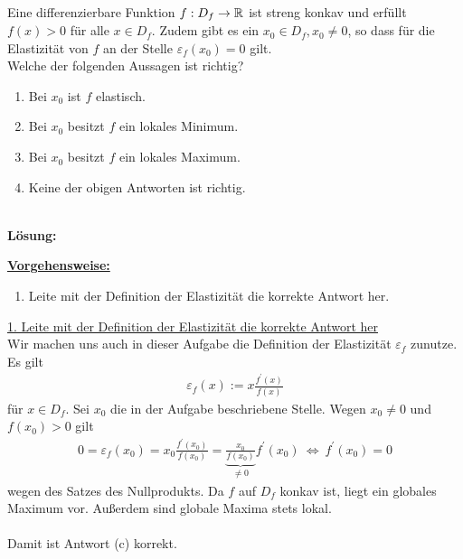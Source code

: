 \subsection*{}
Eine differenzierbare Funktion $ f : D_f \to \mathbb{R}  $ ist streng konkav und erfüllt $ f(x)  > 0 $ für alle $ x \in D_f $.
Zudem gibt es ein $ x_0 \in D_f, x_0 \neq 0 $, so dass für die Elastizität von $ f $ an der Stelle $ \varepsilon_f(x_0 ) = 0 $ gilt.\\
Welche der folgenden Aussagen ist richtig?
\renewcommand{\labelenumi}{(\alph{enumi})}
\begin{enumerate}
	\item 
	Bei $ x_0 $ ist $ f $ elastisch.
	\item
	Bei $ x_0 $ besitzt $ f $ ein lokales Minimum.
	
	
	\item
	Bei $ x_0 $ besitzt $ f $ ein lokales Maximum.
	\item
	Keine der obigen Antworten ist richtig.
\end{enumerate}
\ \\
\textbf{Lösung:}
\begin{mdframed}
\underline{\textbf{Vorgehensweise:}}
\renewcommand{\labelenumi}{\theenumi.}
\begin{enumerate}
\item Leite mit der Definition der Elastizität die korrekte Antwort her.
\end{enumerate}
\end{mdframed}

\underline{1. Leite mit der Definition der Elastizität die korrekte Antwort her}\\
Wir machen uns auch in dieser Aufgabe die Definition der Elastizität $ \varepsilon_f $ zunutze.
Es gilt 
\begin{align*}
	\varepsilon_f(x) := x \frac{f^\prime(x)}{f(x)}
\end{align*}
für $ x \in D_f $. 
Sei $ x_0 $ die in der Aufgabe beschriebene Stelle.
Wegen $ x_0 \neq 0 $ und $ f(x_0 ) > 0 $ gilt
\begin{align*}
	0 = \varepsilon_f(x_0) = x_0 \frac{f^\prime(x_0)}{f(x_0)}
	=
	\underbrace{\frac{x_0}{f(x_0)}}_{\neq 0} f^\prime(x_0)
	\ \Leftrightarrow \
	f^{\prime}(x_0) = 0
\end{align*} 
wegen des Satzes des Nullprodukts.
Da $ f $ auf $ D_f $ konkav ist, liegt ein globales Maximum vor.
Außerdem sind globale Maxima stets lokal.\\
\\
Damit ist Antwort (c) korrekt.
\newpage
